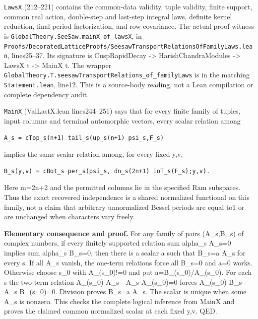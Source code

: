 \texttt{LawsX} (212--221) contains the common-data validity, tuple validity, finite support, common real action, double-step and last-step integral laws, definite kernel reduction, final period factorization, and row covariance. The actual proof witness is \texttt{GlobalTheory.SeeSaw.mainX\_of\_lawsX}, in \texttt{Proofs/DecoratedLatticeProofs/SeesawTransportRelationsOfFamilyLaws.lean}, lines25--37. Its signature is CuspRapidDecay -\textgreater{} HarishChandraModules -\textgreater{} LawsX t -\textgreater{} MainX t. The wrapper \texttt{GlobalTheory.T.seesawTransportRelations\_of\_familyLaws} is in the matching \texttt{Statement.lean}, line12. This is a source-body reading, not a Lean compilation or complete dependency audit.

\texttt{MainX} (ValLastX.lean lines244--251) says that for every finite family of tuples, input columns and terminal automorphic vectors, every scalar relation among

\begin{verbatim}
A_s = cTop_s(n+1) tail_s(up_s(n+1) psi_s,F_s)
\end{verbatim}

implies the same scalar relation among, for every fixed y,v,

\begin{verbatim}
B_s(y,v) = cBot_s per_s(psi_s, dn_s(2n+1) ioT_s(F_s);y,v).
\end{verbatim}

Here m=2n+2 and the permitted columns lie in the specified Ram subspaces. Thus the exact recovered independence is a shared normalized functional on this family, not a claim that arbitrary unnormalized Bessel periods are equal to1 or are unchanged when characters vary freely.

\textbf{Elementary consequence and proof.} For any family of pairs (A\_s,B\_s) of complex numbers, if every finitely supported relation sum alpha\_s A\_s=0 implies sum alpha\_s B\_s=0, then there is a scalar a such that B\_s=a A\_s for every s. If all A\_s vanish, the one-term relations force all B\_s=0 and a=0 works. Otherwise choose s\_0 with A\_(s\_0)!=0 and put a=B\_(s\_0)/A\_(s\_0). For each s the two-term relation A\_(s\_0) A\_s - A\_s A\_(s\_0)=0 forces A\_(s\_0) B\_s - A\_s B\_(s\_0)=0. Division proves B\_s=a A\_s. The scalar is unique when some A\_s is nonzero. This checks the complete logical inference from MainX and proves the claimed common normalized scalar at each fixed y,v. QED.


